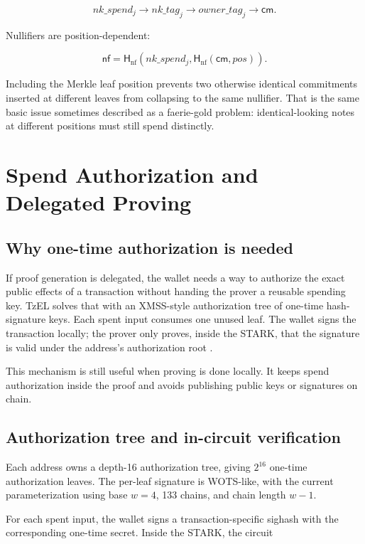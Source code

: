 \documentclass[11pt]{article}
\newcommand{\TzEL}{TzEL}
\newcommand{\Hash}{\mathsf{H}}
\newcommand{\cm}{\mathsf{cm}}
\newcommand{\nf}{\mathsf{nf}}
\begin{document}
\[
nk\_spend_j \rightarrow nk\_tag_j \rightarrow owner\_tag_j \rightarrow \cm.
\]

Nullifiers are position-dependent:

\[
\nf = \Hash_{\mathrm{nf}}(nk\_spend_j, \Hash_{\mathrm{nf}}(\cm, pos)).
\]

Including the Merkle leaf position prevents two otherwise identical commitments
inserted at different leaves from collapsing to the same nullifier. That is the
same basic issue sometimes described as a faerie-gold problem: identical-looking
notes at different positions must still spend distinctly.

\section{Spend Authorization and Delegated Proving}

\subsection{Why one-time authorization is needed}

If proof generation is delegated, the wallet needs a way to authorize the exact
public effects of a transaction without handing the prover a reusable spending
key. \TzEL{} solves that with an XMSS-style authorization tree of one-time
hash-signature keys. Each spent input consumes one unused leaf. The wallet
signs the transaction locally; the prover only proves, inside the STARK, that
the signature is valid under the address's authorization root
\cite{rfc8391,xmss,wotsplus}.

This mechanism is still useful when proving is done locally. It keeps spend
authorization inside the proof and avoids publishing public keys or signatures
on chain.

\subsection{Authorization tree and in-circuit verification}

Each address owns a depth-16 authorization tree, giving \(2^{16}\) one-time
authorization leaves. The per-leaf signature is WOTS-like, with the current
parameterization using base \(w = 4\), 133 chains, and chain length \(w - 1\).

For each spent input, the wallet signs a transaction-specific sighash with the
corresponding one-time secret. Inside the STARK, the circuit
\end{document}
